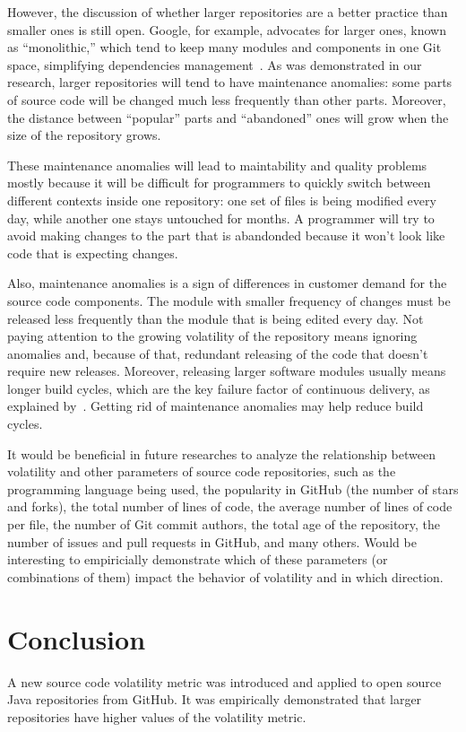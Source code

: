 \documentclass[sigconf]{acmart}
\begin{document}
However, the discussion of whether larger repositories are a better
practice than smaller ones is still open. Google, for example, advocates
for larger ones, known as ``monolithic,'' which tend to keep many modules
and components in one Git space, simplifying dependencies management~\citep{jaspan2018}.
As was demonstrated in our research, larger repositories will tend to
have maintenance anomalies: some parts of source code will be changed much
less frequently than other parts. Moreover, the distance between ``popular''
parts and ``abandoned'' ones will grow when the size of the repository grows.

These maintenance anomalies will lead to maintability and quality problems
mostly because it will be difficult for programmers to quickly switch between
different contexts inside one repository: one set of files is being modified
every day, while another one stays untouched for months. A programmer will
try to avoid making changes to the part that is abandonded because it won't
look like code that is expecting changes.

Also, maintenance anomalies is a sign of differences in customer demand
for the source code components. The module with smaller frequency of changes
must be released less frequently than the module that is being edited every day.
Not paying attention to the growing volatility of the repository means
ignoring anomalies and, because of that, redundant releasing of the code
that doesn't require new releases. Moreover, releasing larger software modules
usually means longer build cycles, which are the key failure factor of
continuous delivery, as explained by~\cite{humble2010}. Getting rid of
maintenance anomalies may help reduce build cycles.

It would be beneficial in future researches to analyze the relationship between
volatility and other parameters of source code repositories,
such as
the programming language being used,
the popularity in GitHub (the number of stars and forks),
the total number of lines of code,
the average number of lines of code per file,
the number of Git commit authors,
the total age of the repository,
the number of issues and pull requests in GitHub,
and many others.
Would be interesting to empiricially demonstrate which of these parameters
(or combinations of them)
impact the behavior of volatility and in which direction.

\section{Conclusion}
\label{sec:conclusion}

A new source code volatility metric was introduced and applied
to \thetotalrepos{} open source Java repositories from GitHub. It was
empirically demonstrated that larger repositories have higher values
of the volatility metric.




\end{document}
